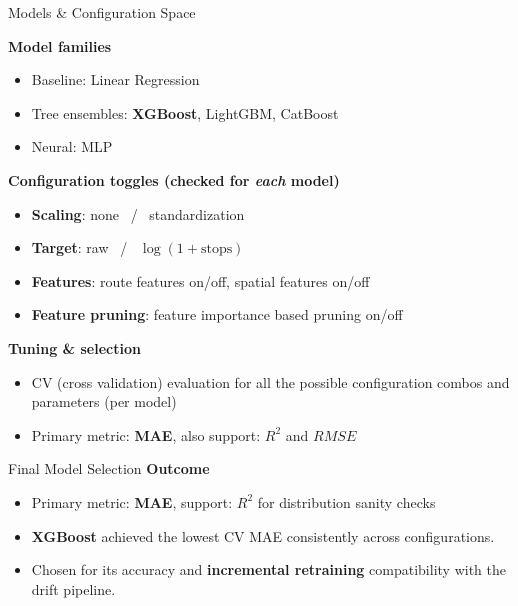 \documentclass[aspectratio=169,11pt]{beamer}
\begin{document}
\begin{frame}{Models \& Configuration Space}

    \textbf{Model families}
    \begin{itemize}
        \item Baseline: Linear Regression
        \item Tree ensembles: \textbf{XGBoost}, LightGBM, CatBoost
        \item Neural: MLP
    \end{itemize}

    \vspace{0.6em}
    \textbf{Configuration toggles (checked for \emph{each} model)}
    \begin{itemize}
        \item \textbf{Scaling}: none \ / \ standardization
        \item \textbf{Target}: raw \ / \ \(\log(1+\text{stops})\)
        \item \textbf{Features}: route features on/off, spatial features on/off
        \item \textbf{Feature pruning}: feature importance based pruning on/off
    \end{itemize}

    \vspace{0.6em}
    \textbf{Tuning \& selection}
    \begin{itemize}
        \item CV (cross validation) evaluation for all the possible configuration combos and parameters (per model)
        \item Primary metric: \textbf{MAE}, also support: \(R^2\) and \(RMSE\)
    \end{itemize}

\end{frame}
\begin{frame}{Final Model Selection}
    \vspace{0.6em}
    \textbf{Outcome}
    \begin{itemize}
        \item Primary metric: \textbf{MAE}, support: \(R^2\) for distribution sanity checks
        \item \textbf{XGBoost} achieved the lowest CV MAE consistently across configurations.
        \item Chosen for its accuracy and \textbf{incremental retraining} compatibility with the drift pipeline.
    \end{itemize}

\end{frame}
\end{document}
